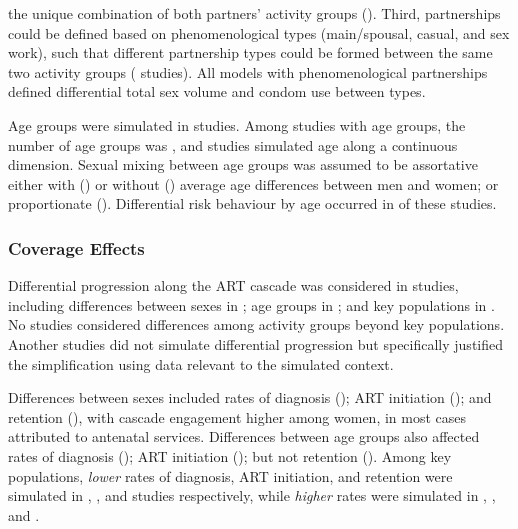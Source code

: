the unique combination of both partners' activity groups ().
Third, partnerships could be defined based on phenomenological types 
(main/spousal, casual, and sex work), such that
different partnership types could be formed between the same two activity groups ( studies).
All models with phenomenological partnerships defined differential total sex volume and condom use between types.  %
\par
Age groups were simulated in  studies.
Among studies with age groups, the number of age groups was ,
and  studies simulated age along a continuous dimension.
Sexual mixing between age groups was assumed to be assortative
either with () or without ()
average age differences between men and women;
or proportionate ().
Differential risk behaviour by age occurred in  of these  studies.
\subsubsection{Coverage Effects}
\label{sss:res:cov}
Differential progression along the ART cascade was considered in  %
 studies, including differences between
sexes in ;
age groups in ; and
key populations in .
No studies considered differences among activity groups beyond key populations. %
Another  studies did not simulate differential progression  %
but specifically justified the simplification using data relevant to the simulated context.
\par
Differences between sexes included
rates of diagnosis ();
ART initiation (); and
retention (),
with cascade engagement higher among women,
in most cases attributed to antenatal services.
Differences between age groups also affected
rates of diagnosis ();
ART initiation ();
but not retention ().
Among key populations, \emph{lower} rates of
diagnosis, ART initiation, and retention were simulated in
, , and 
studies respectively, while \emph{higher} rates were simulated in
, , and .
